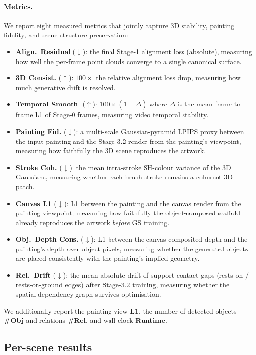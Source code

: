 \documentclass[10pt,twocolumn,letterpaper]{article}
\begin{document}
\paragraph{Metrics.}
We report eight measured metrics that jointly capture 3D stability, painting
fidelity, and scene-structure preservation:
\begin{itemize}
\item \textbf{Align.\ Residual} ($\downarrow$): the final Stage-1 alignment
loss (absolute), measuring how well the per-frame point clouds converge to a
single canonical surface.
\item \textbf{3D Consist.} ($\uparrow$): $100\times$ the relative alignment
loss drop, measuring how much generative drift is resolved.
\item \textbf{Temporal Smooth.} ($\uparrow$): $100\times(1-\bar{\Delta})$
where $\bar{\Delta}$ is the mean frame-to-frame L1 of Stage-0 frames,
measuring video temporal stability.
\item \textbf{Painting Fid.} ($\downarrow$): a multi-scale Gaussian-pyramid
LPIPS proxy between the input painting and the Stage-3.2 render from the
painting's viewpoint, measuring how faithfully the 3D scene reproduces the
artwork.
\item \textbf{Stroke Coh.} ($\downarrow$): the mean intra-stroke SH-colour
variance of the 3D Gaussians, measuring whether each brush stroke remains a
coherent 3D patch.
\item \textbf{Canvas L1} ($\downarrow$): L1 between the painting and the
canvas render from the painting viewpoint, measuring how faithfully the
object-composed scaffold already reproduces the artwork \emph{before} GS
training.
\item \textbf{Obj.\ Depth Cons.} ($\downarrow$): L1 between the
canvas-composited depth and the painting's depth over object pixels,
measuring whether the generated objects are placed consistently with the
painting's implied geometry.
\item \textbf{Rel.\ Drift} ($\downarrow$): the mean absolute drift of
support-contact gaps (rests-on / rests-on-ground edges) after Stage-3.2
training, measuring whether the spatial-dependency graph survives
optimisation.
\end{itemize}
We additionally report the painting-view \textbf{L1}, the number of detected
objects \textbf{\#Obj} and relations \textbf{\#Rel}, and wall-clock
\textbf{Runtime}.

\subsection{Per-scene results}
\label{sec:exp-main}
\end{document}
